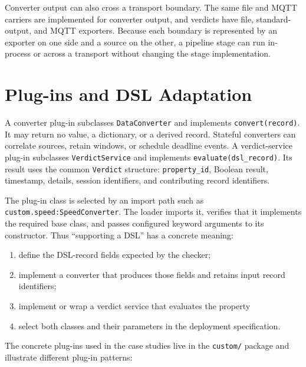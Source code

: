 Converter output can also cross a transport boundary. The same file and MQTT
carriers are implemented for converter output, and verdicts have file,
standard-output, and MQTT exporters. Because each boundary is represented by
an exporter on one side and a source on the other, a pipeline stage can run
in-process or across a transport without changing the stage implementation.

\section{Plug-ins and DSL Adaptation}\label{sec:plugins}

A converter plug-in subclasses \texttt{DataConverter} and implements
\texttt{convert(record)}. It may return no value, a dictionary, or a derived
record. Stateful converters can correlate sources, retain windows, or schedule
deadline events. A verdict-service plug-in subclasses
\texttt{VerdictService} and implements \texttt{evaluate(dsl\_record)}. Its
result uses the common \texttt{Verdict} structure:
\texttt{property\_id}, Boolean result, timestamp, details, session identifiers,
and contributing record identifiers.

The plug-in class is selected by an import path such as
\texttt{custom.speed:SpeedConverter}. The loader imports it, verifies that it
implements the required base class, and passes configured keyword arguments to
its constructor. Thus ``supporting a DSL'' has a concrete meaning:

\begin{enumerate}
  \item define the DSL-record fields expected by the checker;
  \item implement a converter that produces those fields and retains input
  record identifiers;
  \item implement or wrap a verdict service that evaluates the property
  \item select both classes and their parameters in the deployment
  specification.
\end{enumerate}

The concrete plug-ins used in the case studies live in the \texttt{custom/}
package and illustrate different plug-in patterns:

